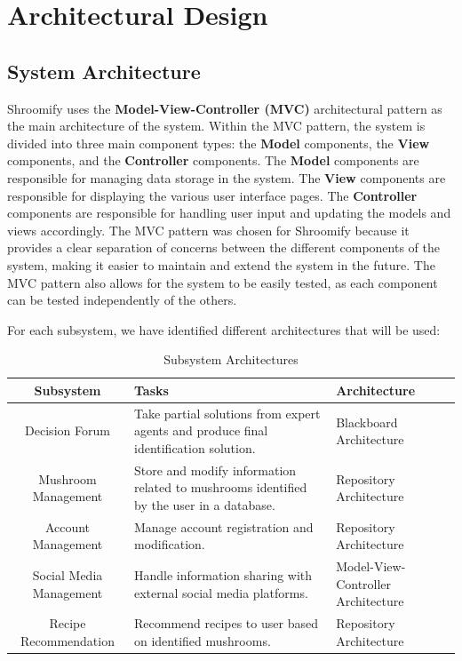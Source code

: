 \documentclass[]{article}
\begin{document}
\clearpage
\section{Architectural Design}
\label{sec:architectural_design}

\subsection{System Architecture}
\label{sub:system_architecture}


Shroomify uses the \textbf{Model-View-Controller (MVC)} architectural pattern 
as the main architecture of the system. Within the MVC pattern, the system is 
divided into three main component types: the \textbf{Model} components, the \textbf{View} components, and 
the \textbf{Controller} components. The \textbf{Model} components are responsible for managing 
data storage in the system. The \textbf{View} components are responsible 
for displaying the various user interface pages. The \textbf{Controller} components 
are responsible for handling user input and updating the models and views accordingly. 
The MVC pattern was chosen for Shroomify because it provides a clear 
separation of concerns between the different components of the system, 
making it easier to maintain and extend the system in the future. The MVC 
pattern also allows for the system to be easily tested, as each component 
can be tested independently of the others.

\vspace{5pt}
For each subsystem, we have identified different architectures that will be used:
\begin{table}[H]
	\centering
	\begin{tabular}{cp{7cm}p{4cm}}
		\toprule
		Subsystem & Tasks & Architecture \\
		\midrule
		Decision Forum & Take partial solutions from expert agents and produce final identification solution. & Blackboard Architecture \\
		Mushroom Management & Store and modify information related to mushrooms identified by the user in a database. & Repository Architecture \\
		Account Management & Manage account registration and modification.  & Repository Architecture \\
		Social Media Management & Handle information sharing with external social media platforms. & Model-View-Controller Architecture\\
		Recipe Recommendation & Recommend recipes to user based on identified mushrooms. & Repository Architecture \\
		\bottomrule
	\end{tabular}
	\caption{Subsystem Architectures}
\end{table}
\end{document}
